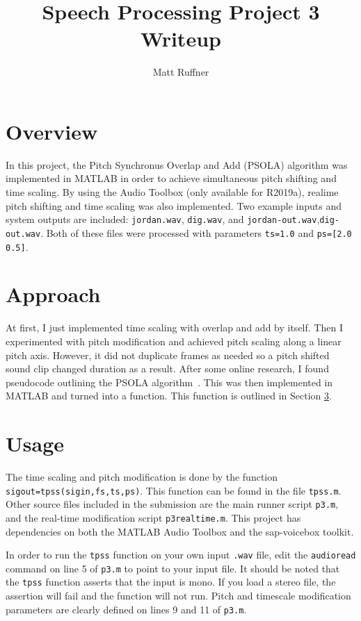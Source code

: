 \documentclass[letterpaper]{article}
\title{Speech Processing Project 3 Writeup}
\author{Matt Ruffner}
\begin{document}
\maketitle

\section{Overview}

In this project, the Pitch Synchronus Overlap and Add (PSOLA) algorithm was implemented in MATLAB in order to achieve simultaneous pitch shifting and time scaling. By using the Audio Toolbox (only available for R2019a), realime pitch shifting and time scaling was also implemented. Two example inputs and system outputs are included: \texttt{jordan.wav}, \texttt{dig.wav}, and \texttt{jordan-out.wav},\texttt{dig-out.wav}. Both of these files were processed with parameters \texttt{ts=1.0} and \texttt{ps=[2.0 0.5]}.

\section{Approach}
At first, I just implemented time scaling with overlap and add by itself. Then I experimented with pitch modification and achieved pitch scaling along a linear pitch axis. However, it did not duplicate frames as needed so a pitch shifted sound clip changed duration as a result. After some online research, I found pseudocode outlining the PSOLA algorithm~\cite{2011Ddae}. This was then implemented in MATLAB and turned into a function. This function is outlined in Section \ref{sec:usage}.


\section{Usage}
\label{sec:usage}
The time scaling and pitch modification is done by the function \texttt{sigout=tpss(sigin,fs,ts,ps)}. This function can be found in the file \texttt{tpss.m}. Other source files included in the submission are the main runner script \texttt{p3.m}, and the real-time modification script \texttt{p3realtime.m}. This project has dependencies on both the MATLAB Audio Toolbox and the sap-voicebox toolkit.

In order to run the \texttt{tpss} function on your own input \texttt{.wav} file, edit the \texttt{audioread} command on line 5 of \texttt{p3.m} to point to your input file. It should be noted that the \texttt{tpss} function asserts that the input is mono. If you load a stereo file, the assertion will fail and the function will not run. Pitch and timescale modification parameters are clearly defined on lines 9 and 11 of \texttt{p3.m}.
\end{document}
